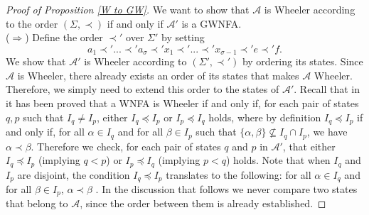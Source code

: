 \documentclass[runningheads]{llncs}
\newcommand{\tocheck}[1]{{\color{blue} #1}}
\begin{document}
\begin{proof}[\noindent Proof of Proposition \ref{W to GW}]
We want to show that $\mathcal{A}$ is Wheeler according to the order $( \Sigma, \prec )$ if and only if $\mathcal{A'}$ is a GWNFA.\\
($\Longrightarrow$) Define the order $\prec'$ over $\Sigma'$ by setting
\[
a_1 \prec' ... \prec' a_\sigma \prec' x_1 \prec' ... \prec' x_{\sigma-1} \prec' e \prec' f.\]
We show that $\mathcal A'$ is Wheeler according to $(\Sigma' , \prec')$ by ordering its states. Since $\mathcal{A}$ is Wheeler, there already exists an order of its states that makes $\mathcal{A}$ Wheeler. 
Therefore, we simply need to extend this order to the states of $\mathcal A'$. 
Recall that in \cite{ADPP} it has been proved that a WNFA is Wheeler if and only if, for each pair of states $q,p$ such that $I_q \ne I_p$, either $I_q \preceq I_p$ or $I_p \preceq I_q$ holds, where by definition $I_q \preceq I_p$ if and only if, for all $\alpha \in I_q$ and for all $\beta \in I_p$ such that $\{\alpha, \beta\}\not\subseteq I_q\cap I_p$, we have $\alpha \prec \beta$. Therefore we check, for each pair of states $q$ and $p$ in $\mathcal A'$, that either $I_q \preceq I_p$ (implying $q<p$) or $I_p \preceq I_q$ (implying $p<q$) holds.
Note that when $I_q$ and $I_p$ are disjoint, the condition $I_q \preceq I_p$ translates to the following: for all $\alpha \in I_q$ and for all $\beta \in I_p$, $\alpha \prec \beta$ . 
In the discussion that follows we never compare two states that belong to $\mathcal A$, since the order between them is already established.


\end{proof}
\end{document}
